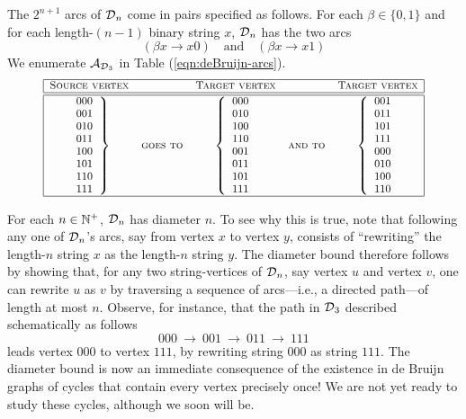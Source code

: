 The $2^{n+1}$ arcs of $\mbox{$\cal D$}_n$ come in pairs specified as follows.  For each $\beta \in \{0,1\}$ and for each length-$(n-1)$ binary string $x$, $\mbox{$\cal D$}_n$ has the two arcs
\[ (\beta x \rightarrow x0) \ \ \ \mbox{ and } \ \ \  (\beta x \rightarrow x1) \]
We enumerate $\mbox{$\cal A$}_{\mbox{{\scriptsize $\cal D$}}_3}$ in Table (\ref{eqn:deBruijn-arcs}).
\begin{equation}
\label{eqn:deBruijn-arcs}
{\small
\begin{array}{|ccccc|}
\hline
\mbox{\sc Source vertex} & & \mbox{\sc Target vertex} & & \mbox{\sc Target vertex} \\
\hline \hline
{\displaystyle
\left.
\begin{array}{c}
000 \\
001 \\
010 \\
011 \\
100 \\
101 \\
110 \\
111
\end{array}
\right\}
} &
\mbox{\sc goes to} 
  &
{\displaystyle
\left\{
\begin{array}{c}
000 \\
010 \\
100 \\
110 \\
001 \\
011 \\
101 \\
111
\end{array}
\right.
}
  &
\mbox{\sc and to}
  &
{\displaystyle
\left\{
\begin{array}{c}
001 \\
011 \\
101 \\
111 \\
000 \\
010 \\
100 \\
110
\end{array} 
\right.
}
 \\
\hline
\end{array}
}
\end{equation}

\smallskip

For each $n \in \mathbb{N}^+$, $\mbox{$\cal D$}_n$ has diameter $n$.  To see why this is true, note that following any one of $\mbox{$\cal D$}_n$'s arcs, say from vertex $x$ to vertex $y$, consists of ``rewriting'' the length-$n$ string $x$ as the length-$n$ string $y$.  The diameter bound therefore follows by showing that, for any two string-vertices of $\mbox{$\cal D$}_n$, say vertex $u$ and vertex $v$, one can rewrite $u$ as $v$ by traversing a sequence of arcs---i.e., a directed path---of length at most $n$.  Observe, for instance, that the path in $\mbox{$\cal D$}_3$ described schematically as follows
\[ 000 \ \rightarrow \ 001 \ \rightarrow \ 011 \ \rightarrow \ 111 \]
leads vertex $000$ to vertex $111$, by rewriting string $000$ as string $111$.  The diameter bound is now an immediate consequence of the existence in de Bruijn graphs of cycles that contain every vertex precisely once!  We are not yet ready to study these cycles, although we soon will be.

